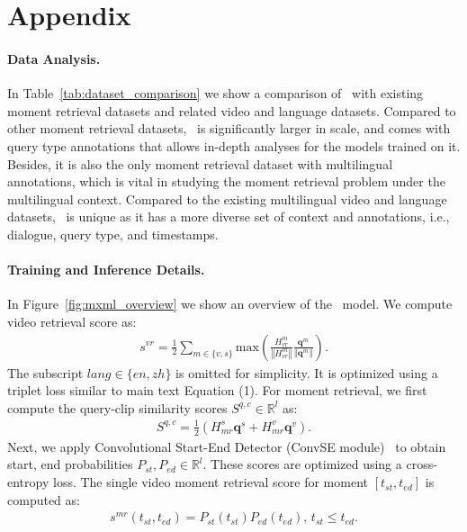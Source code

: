 
\appendix

\section{Appendix}

\paragraph{Data Analysis.}
In Table~\ref{tab:dataset_comparison} we show a comparison of \DsetName~with existing moment retrieval datasets and related video and language datasets. 
Compared to other moment retrieval datasets, \DsetName~is significantly larger in scale, and comes with query type annotations that allows in-depth analyses for the models trained on it.
Besides, it is also the only moment retrieval dataset with multilingual annotations, which is vital in studying the moment retrieval problem under the multilingual context. 
Compared to the existing multilingual video and language datasets, \DsetName~is unique as it has a more diverse set of context and annotations, i.e., dialogue, query type, and timestamps.


\paragraph{Training and Inference Details.}
In Figure~\ref{fig:mxml_overview} we show an overview of the \ModelName~model.
We compute video retrieval score as:
\begin{align}
    s^{vr} = \frac{1}{2}\sum_{m \in \{v, s\}} \mathrm{max}(\frac{H^{m}_{vr}}{\left\Vert H^{m}_{vr}\right\Vert} \frac{\boldsymbol{q}^{m}}{\left\Vert \boldsymbol{q}^{m}\right\Vert}).
\end{align}
The subscript $lang \in \{en, zh\}$ is omitted for simplicity.
It is optimized using a triplet loss similar to main text Equation (1).
For moment retrieval, we first compute the query-clip similarity scores $S^{q,c} \in \mathbb{R}^{l}$ as:
\begin{align}
    S^{q,c} = \frac{1}{2}(H^{s}_{mr}\boldsymbol{q}^{s} + H^{v}_{mr}\boldsymbol{q}^{v}).
\end{align}
Next, we apply Convolutional Start-End Detector (ConvSE module)~\cite{lei2020tvr} to obtain start, end probabilities $P_{st}, P_{ed} \in \mathbb{R}^{l}$. These scores are optimized using a cross-entropy loss. The single video moment retrieval score for moment $[t_{st}, t_{ed}]$ is computed as:
\begin{align}
    s^{mr}(t_{st}, t_{ed}) = P_{st}(t_{st}) P_{ed}(t_{ed}), \, t_{st} \leq t_{ed}.
\end{align}

